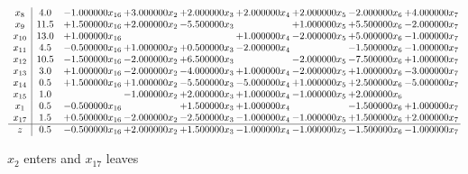 \documentclass[10pt]{article}
\begin{document}
 \[\begin{array}{c| c c@{\hskip 2pt} c@{\hskip 2pt} c@{\hskip 2pt} c@{\hskip 2pt} c@{\hskip 2pt} c@{\hskip 2pt} c@{\hskip 2pt} }
 x_{8}   &  4.0 & -1.000000 x_{16} & + 3.000000 x_{2} & + 2.000000 x_{3} & + 2.000000 x_{4} & + 2.000000 x_{5} & -2.000000 x_{6} & + 4.000000 x_{7}\\
 x_{9}   &  11.5 & + 1.500000 x_{16} & + 2.000000 x_{2} & -5.500000 x_{3} &   & + 1.000000 x_{5} & + 5.500000 x_{6} & -2.000000 x_{7}\\
 x_{10}   &  13.0 & + 1.000000 x_{16} &    &   & + 1.000000 x_{4} & -2.000000 x_{5} & + 5.000000 x_{6} & -1.000000 x_{7}\\
 x_{11}   &  4.5 & -0.500000 x_{16} & + 1.000000 x_{2} & + 0.500000 x_{3} & -2.000000 x_{4} &   & -1.500000 x_{6} & -1.000000 x_{7}\\
 x_{12}   &  10.5 & -1.500000 x_{16} & -2.000000 x_{2} & + 6.500000 x_{3} &   & -2.000000 x_{5} & -7.500000 x_{6} & + 1.000000 x_{7}\\
 x_{13}   &  3.0 & + 1.000000 x_{16} & -2.000000 x_{2} & -4.000000 x_{3} & + 1.000000 x_{4} & -2.000000 x_{5} & + 1.000000 x_{6} & -3.000000 x_{7}\\
 x_{14}   &  0.5 & + 1.500000 x_{16} & + 1.000000 x_{2} & -5.500000 x_{3} & -5.000000 x_{4} & + 1.000000 x_{5} & + 2.500000 x_{6} & -5.000000 x_{7}\\
 x_{15}   &  1.0  &   & -1.000000 x_{2} & + 2.000000 x_{3} & + 1.000000 x_{4} & -1.000000 x_{5} & + 2.000000 x_{6} &   \\
 x_{1}   &  0.5 & -0.500000 x_{16} &   & + 1.500000 x_{3} & + 1.000000 x_{4} &   & -1.500000 x_{6} & + 1.000000 x_{7}\\
 x_{17}   &  1.5 & + 0.500000 x_{16} & -2.000000 x_{2} & -2.500000 x_{3} & -1.000000 x_{4} & -1.000000 x_{5} & + 1.500000 x_{6} & + 2.000000 x_{7}\\
\hline
z    &  0.5 & -0.500000 x_{16} & + 2.000000 x_{2} & + 1.500000 x_{3} & -1.000000 x_{4} & -1.000000 x_{5} & -1.500000 x_{6} & -1.000000 x_{7}\\
\end{array}\]


 $ x_{2} $ enters and $ x_{17} $ leaves 
\end{document}
